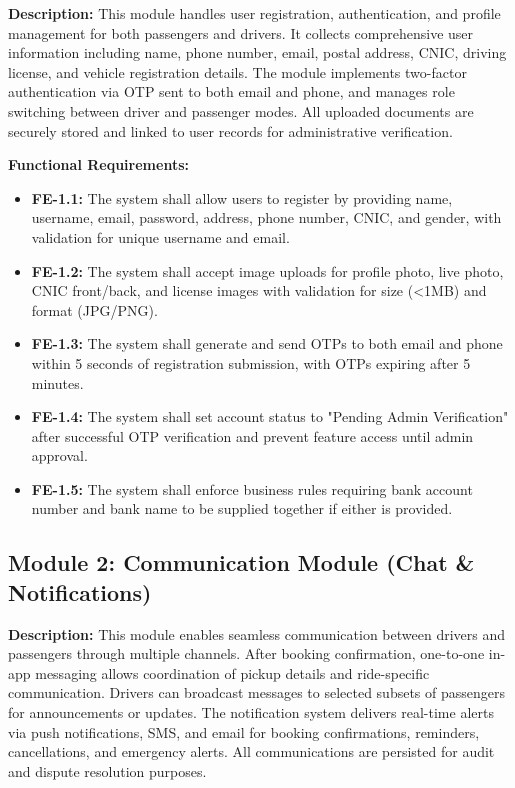 \textbf{Description:} This module handles user registration, authentication, and profile management for both passengers and drivers. It collects comprehensive user information including name, phone number, email, postal address, CNIC, driving license, and vehicle registration details. The module implements two-factor authentication via OTP sent to both email and phone, and manages role switching between driver and passenger modes. All uploaded documents are securely stored and linked to user records for administrative verification.

\textbf{Functional Requirements:}

\begin{itemize}
    \item \textbf{FE-1.1:} The system shall allow users to register by providing name, username, email, password, address, phone number, CNIC, and gender, with validation for unique username and email.
    
    \item \textbf{FE-1.2:} The system shall accept image uploads for profile photo, live photo, CNIC front/back, and license images with validation for size (<1MB) and format (JPG/PNG).
    
    \item \textbf{FE-1.3:} The system shall generate and send OTPs to both email and phone within 5 seconds of registration submission, with OTPs expiring after 5 minutes.
    
    \item \textbf{FE-1.4:} The system shall set account status to "Pending Admin Verification" after successful OTP verification and prevent feature access until admin approval.
    
    \item \textbf{FE-1.5:} The system shall enforce business rules requiring bank account number and bank name to be supplied together if either is provided.
\end{itemize}

\subsection{Module 2: Communication Module (Chat \& Notifications)}

\textbf{Description:} This module enables seamless communication between drivers and passengers through multiple channels. After booking confirmation, one-to-one in-app messaging allows coordination of pickup details and ride-specific communication. Drivers can broadcast messages to selected subsets of passengers for announcements or updates. The notification system delivers real-time alerts via push notifications, SMS, and email for booking confirmations, reminders, cancellations, and emergency alerts. All communications are persisted for audit and dispute resolution purposes.

